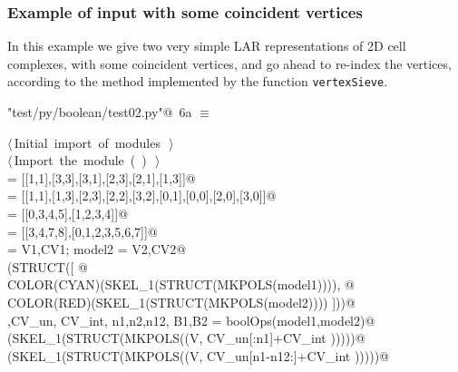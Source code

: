 \documentclass[11pt,oneside]{article}	%
\begin{document}
\subsubsection{Example of input with some coincident vertices}
In this example we give two very simple LAR representations of 2D cell complexes, with some coincident vertices, and go ahead to re-index the vertices, according to the method implemented by the function \texttt{vertexSieve}.

\begin{flushleft} \small
\begin{minipage}{\linewidth} \label{scrap9}
\protect{}\verb@"test/py/boolean/test02.py"@\nobreak\ {\footnotesize 6a }$\equiv$
\vspace{-1ex}
\begin{list}{}{} \item
\mbox{}\verb@@\hbox{$\langle\,$Initial import of modules\nobreak\ {\footnotesize {}}$\,\rangle$}\verb@@\\
\mbox{}\verb@@\hbox{$\langle\,$Import the module\nobreak\ ({\footnotesize {}\label{scrap10}
 }\mbox{}\verb@boolean@ ) {\footnotesize {}}$\,\rangle$}\verb@@\\
\mbox{} = [[1,1],[3,3],[3,1],[2,3],[2,1],[1,3]]@\\
\mbox{} = [[1,1],[1,3],[2,3],[2,2],[3,2],[0,1],[0,0],[2,0],[3,0]]@\\
\mbox{} = [[0,3,4,5],[1,2,3,4]]@\\
\mbox{} = [[3,4,7,8],[0,1,2,3,5,6,7]]@\\
\mbox{} = V1,CV1; model2 = V2,CV2@\\
\mbox{}\verb@VIEW(STRUCT([ @\\
\mbox{}\verb@   COLOR(CYAN)(SKEL_1(STRUCT(MKPOLS(model1)))), @\\
\mbox{}\verb@   COLOR(RED)(SKEL_1(STRUCT(MKPOLS(model2)))) ]))@\\
\mbox{}\verb@V,CV_un, CV_int, n1,n2,n12, B1,B2 = boolOps(model1,model2)@\\
\mbox{}\verb@VIEW(SKEL_1(STRUCT(MKPOLS((V, CV_un[:n1]+CV_int )))))@\\
\mbox{}\verb@VIEW(SKEL_1(STRUCT(MKPOLS((V, CV_un[n1-n12:]+CV_int )))))@\\
\mbox{}\verb@@{\NWsep}
\end{list}
\vspace{-2ex}
\end{minipage}\\[4ex]
\end{flushleft}
\end{document}
